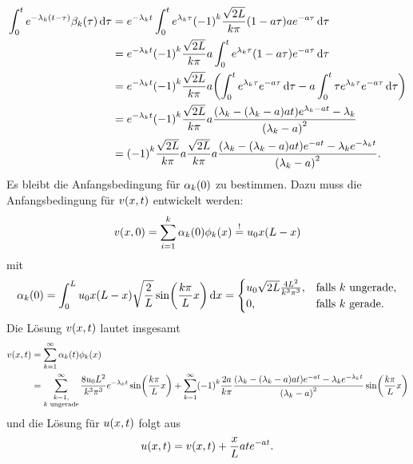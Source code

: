 \documentclass{exercise}
\begin{document}
    \begin{align*}
        \int_0^t e^{-\lambda_k\parentheses*{t - \tau}}\beta_k\parentheses*{\tau}\d\tau &= e^{-\lambda_k t}\int_0^t e^{\lambda_k \tau}\parentheses*{-1}^k \frac{\sqrt{2L}}{k\pi}\parentheses*{1 - a\tau}ae^{-a\tau}\d\tau\\
        &= e^{-\lambda_k t}\parentheses*{-1}^k \frac{\sqrt{2L}}{k\pi}a\int_0^t e^{\lambda_k \tau}\parentheses*{1 - a\tau}e^{-a\tau}\d\tau\\
        &= e^{-\lambda_k t}\parentheses*{-1}^k \frac{\sqrt{2L}}{k\pi}a\parentheses*{\int_0^t e^{\lambda_k \tau}e^{-a\tau}\d\tau - a\int_0^t \tau e^{\lambda_k \tau}e^{-a\tau}\d\tau}\\
        &= e^{-\lambda_k t}\parentheses*{-1}^k \frac{\sqrt{2L}}{k\pi}a\frac{\parentheses*{\lambda_k - \parentheses*{\lambda_k - a}at}e^{\lambda_k - at} - \lambda_k}{\parentheses*{\lambda_k - a}^2}\\
        &= \parentheses*{-1}^k \frac{\sqrt{2L}}{k\pi}a\frac{\sqrt{2L}}{k\pi}a\frac{\parentheses*{\lambda_k - \parentheses*{\lambda_k - a}at}e^{-at} - \lambda_k e^{-\lambda_k t}}{\parentheses*{\lambda_k - a}^2}.
    \end{align*}
    Es bleibt die Anfangsbedingung für \(\alpha_k\parentheses*{0}\) zu bestimmen.
    Dazu muss die Anfangsbedingung für \(v\parentheses*{x, t}\) entwickelt werden:
    \[
        v\parentheses*{x, 0} = \sum_{i = 1}^k \alpha_k\parentheses*{0}\phi_k\parentheses*{x} \stackrel{!}{=} u_0 x\parentheses*{L - x}
    \]
    mit
    \[
        \alpha_k\parentheses*{0} = \int_0^L u_0 x\parentheses*{L - x}\sqrt{\frac{2}{L}}\sin\parentheses*{\frac{k\pi}{L}x}\d x = \begin{cases}
            u_0 \sqrt{2L}\frac{4L^2}{k^3 \pi^3}, & \text{falls }k\text{ ungerade},\\
            0, & \text{falls }k\text{ gerade}.
        \end{cases}
    \]
    Die Lösung \(v\parentheses*{x, t}\) lautet insgesamt
    \begin{align*}
        v\parentheses*{x, t} &= \sum_{k = 1}^\infty \alpha_k\parentheses*{t}\phi_k\parentheses*{x}\\
        &= \sum_{\substack{k = 1,\\k\text{ ungerade}}}^\infty \frac{8u_0 L^2}{k^3 \pi^3}e^{-\lambda_k t}\sin\parentheses*{\frac{k\pi}{L}x} + \sum_{k = 1}^\infty \parentheses*{-1}^k \frac{2a}{k\pi}\frac{\parentheses*{\lambda_k - \parentheses*{\lambda_k - a}at}e^{-at} - \lambda_k e^{-\lambda_k t}}{\parentheses*{\lambda_k - a}^2}\sin\parentheses*{\frac{k\pi}{L}x}
    \end{align*}
    und die Lösung für \(u\parentheses*{x, t}\) folgt aus
    \[
        u\parentheses*{x, t} = v\parentheses*{x, t} + \frac{x}{L}ate^{-at}.
    \]
\end{document}
